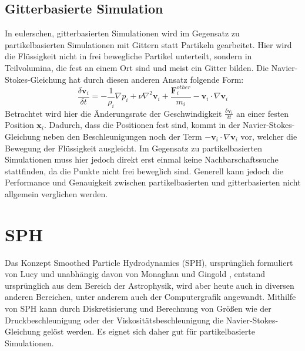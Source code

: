 \documentclass{scrreprt}
\begin{document}
\subsection{Gitterbasierte Simulation}
In eulerschen, gitterbasierten Simulationen wird im Gegensatz zu partikelbasierten Simulationen mit Gittern statt Partikeln gearbeitet.
Hier wird die Flüssigkeit nicht in frei bewegliche Partikel unterteilt, sondern in Teilvolumina, die fest an einem Ort sind und meist ein Gitter bilden.
Die Navier-Stokes-Gleichung hat durch diesen anderen Ansatz folgende Form:
\begin{equation}
    \frac{\delta\textbf{v}_i}{\delta t} = -\frac{1}{\rho_i} \nabla p_i + \nu \nabla^2 \textbf{v}_i + \frac{\textbf{F}_i^{other}}{m_i} - \textbf{v}_i \cdot \nabla \textbf{v}_i
\end{equation}
Betrachtet wird hier die Änderungsrate der Geschwindigkeit $\frac{\delta\textbf{v}_i}{\delta t}$ an einer festen Position $\textbf{x}_i$.
Dadurch, dass die Positionen fest sind,
kommt in der Navier-Stokes-Gleichung neben den Beschleunigungen noch der Term $- \textbf{v}_i \cdot \nabla \textbf{v}_i$ vor,
welcher die Bewegung der Flüssigkeit ausgleicht.
Im Gegensatz zu partikelbasierten Simulationen muss hier jedoch direkt erst einmal keine Nachbarschaftssuche stattfinden,
da die Punkte nicht frei beweglich sind.
Generell kann jedoch die Performance und Genauigkeit zwischen partikelbasierten und gitterbasierten nicht allgemein verglichen werden.

\section{SPH}
Das Konzept Smoothed Particle Hydrodynamics (SPH),
ursprünglich formuliert von Lucy \cite{lucy_numerical_1977} und unabhängig davon von Monaghan und Gingold \cite{gingold_smoothed_1977},
entstand ursprünglich aus dem Bereich der Astrophysik, wird aber heute auch in diversen anderen Bereichen,
unter anderem auch der Computergrafik angewandt.
Mithilfe von SPH kann durch Diskretisierung und Berechnung von Größen wie der Druckbeschleunigung oder der Viskositätsbeschleunigung
die Navier-Stokes-Gleichung gelöst werden.
Es eignet sich daher gut für partikelbasierte Simulationen.
\end{document}
